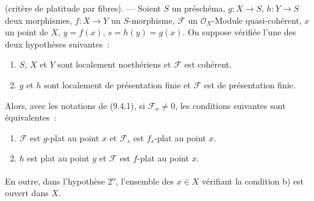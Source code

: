 \begin{theorem}[11.3.10]
(critère de platitude par fibres). --- Soient $S$ un préschéma,
$g:X\to S$, $h:Y\to S$ deux morphismes, $f:X\to Y$ un $S$-morphisme,
$\mathcal F$ un $\mathcal O_X$-Module quasi-cohérent, $x$ un point de $X$,
$y=f(x)$, $s=h(y)=g(x)$. On suppose vérifiée l'une des deux hypothèses
suivantes~:
\begin{enumerate}[label=\arabic{enumi}\textsuperscript{o}]
\item $S$, $X$ et $Y$ sont localement noethériens et $\mathcal F$ est cohérent.
\item $g$ et $h$ sont localement de présentation finie et $\mathcal F$ est de
présentation finie.
\end{enumerate}
Alors, avec les notations de (9.4.1), si $\mathcal F_x\neq0$, les conditions
suivantes sont équivalentes~:
\begin{enumerate}[label=\emph{\alph*)}]
\item $\mathcal F$ est $g$-plat au point $x$ et $\mathcal F_s$ est $f_s$-plat
au point $x$.
\item $h$ est plat au point $y$ et $\mathcal F$ est $f$-plat au point $x$.
\end{enumerate}
En outre, dans l'hypothèse 2\textsuperscript{o}, l'ensemble des $x\in X$
vérifiant la condition b) est ouvert dans $X$.
\end{theorem}

